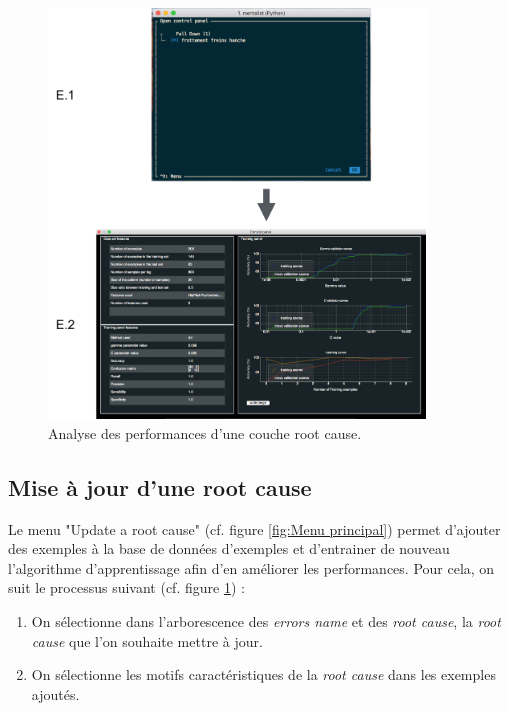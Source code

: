 \begin{figure}[H]
	\centering\includegraphics[width=10cm]{images/perf_menu.png}
	\caption[Analyse des performances d'une couche root cause]{Analyse des performances d'une couche root cause.}
	\label{fig: Analyse des performances d'une couche root cause}
\end{figure} 


\subsection{Mise à jour d'une root cause}
\label{Industrialisation du produit: Utilisation suggérée des outils: Mise à jour d'une root cause}
Le menu "Update a root cause"  (cf. figure \ref{fig:Menu principal}) permet d'ajouter des exemples à la base de données d'exemples et d'entrainer de nouveau l'algorithme d'apprentissage afin d'en améliorer les performances. Pour cela, on suit le processus suivant (cf. figure \ref{fig: Analyse des performances d'une couche root cause}) : 
\begin{enumerate}
	\item On sélectionne dans l'arborescence des \emph{errors name} et des \emph{root cause}, la \emph{root cause} que l'on souhaite mettre à jour.
	\item On sélectionne les motifs caractéristiques de la \emph{root cause} dans les exemples ajoutés.
\end{enumerate}

